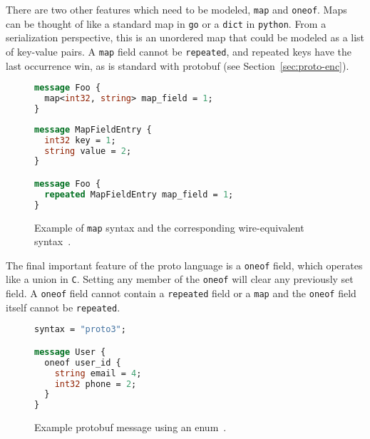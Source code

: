 \documentclass[11pt]{article}
\theoremstyle{definition}
\theoremstyle{plain}
\begin{document}
There are two other features which need to be modeled, \texttt{map} and
\texttt{oneof}. Maps can be thought of like a standard map in \texttt{go} or a
\texttt{dict} in \texttt{python}. From a serialization perspective, this is an
unordered map that could be modeled as a list of key-value pairs. A \texttt{map}
field cannot be \texttt{repeated}, and repeated keys have the last occurrence
win, as is standard with protobuf (see Section~\ref{sec:proto-enc}).

\begin{figure}[H]
	\centering
	\begin{minipage}[bt]{0.43\textwidth}
		\begin{lstlisting}[language=proto]
message Foo {
  map<int32, string> map_field = 1;
}\end{lstlisting}
	\end{minipage}
	\hspace{0.5cm}
	\begin{minipage}[bt]{0.48\textwidth}
		\begin{lstlisting}[language=proto]
message MapFieldEntry {
  int32 key = 1;
  string value = 2;
}

message Foo {
  repeated MapFieldEntry map_field = 1;
}\end{lstlisting}
	\end{minipage}

	\caption{Example of \texttt{map} syntax and the corresponding
		wire-equivalent syntax~\cite{LanguageGuideProto}.}
	\label{fig:proto-map}
\end{figure}

The final important feature of the proto language is a \texttt{oneof} field,
which operates like a union in \texttt{C}. Setting any member of the
\texttt{oneof} will clear any previously set field. A \texttt{oneof} field
cannot contain a \texttt{repeated} field or a \texttt{map} and the
\texttt{oneof} field itself cannot be \texttt{repeated}.

\begin{figure}[H]
	\begin{lstlisting}[language=proto]
syntax = "proto3";

message User {
  oneof user_id {
    string email = 4;
    int32 phone = 2;
  }
}\end{lstlisting}

	\caption{Example protobuf message using an enum~\cite{LanguageGuideProto}.}
	\label{fig:proto-enum2}
\end{figure}
\end{document}
